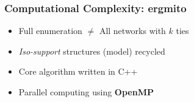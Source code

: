 \documentclass[aspectratio=169,9pt,handout]{beamer}
\begin{document}
\begin{frame}
	\frametitle{Computational Complexity: ergmito}
	\begin{minipage}[m]{.4\linewidth}
		\begin{itemize}
			\item<2-> Full enumeration $\neq$ All networks with $k$ ties
		\end{itemize}
		\begin{itemize}
			\item<4-> \textit{Iso-support} structures (model) recycled
			\item<5-> Core algorithm written in C++
			\item<6-> Parallel computing using \textbf{OpenMP}
		\end{itemize}
	\end{minipage}\hfill
	\begin{minipage}[m]{.59\linewidth}
		\centering
	\end{minipage}
\end{frame}


% 
% 
% 
\end{document}
